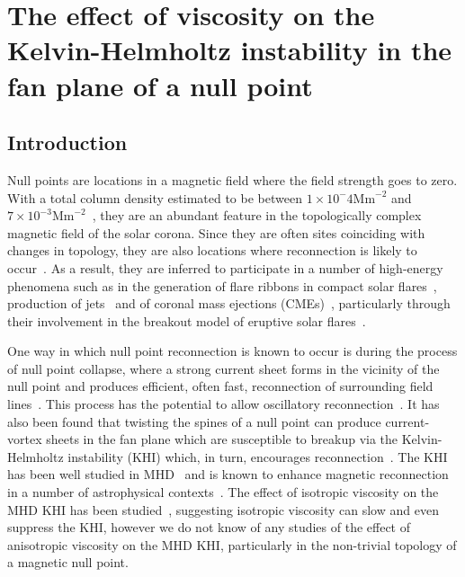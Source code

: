 \chapter{The effect of viscosity on the Kelvin-Helmholtz instability in the fan plane of a null point}

\graphicspath{{images/null_point_khi/}}

\section{Introduction}

Null points are locations in a magnetic field where the field strength goes to zero. With a total column density estimated to be between $1\times 10^-4 \text{Mm}^{-2}$ and $7\times 10^{-3} \text{Mm}^{-2}$~\cite{edwardsNullPointDistribution2015}, they are an abundant feature in the topologically complex magnetic field of the solar corona. Since they are often sites coinciding with changes in topology, they are also locations where reconnection is likely to occur~\cite{yangImagingSpectralStudy2020,sunHOTSPINELOOPS2013}. As a result, they are inferred to participate in a number of high-energy phenomena such as in the generation of flare ribbons in compact solar flares~\cite{massonNATUREFLARERIBBONS2009,pontinWhyAreFlare2016a}, production of jets~\cite{moreno-insertisPLASMAJETSERUPTIONS2013} and of coronal mass ejections (CMEs)~\cite{barnesRelationshipCoronalMagnetic2007,zouContinuousNullPointMagnetic2020}, particularly through their involvement in the breakout model of eruptive solar flares~\cite{macleanTopologicalAnalysisMagnetic2005}.

One way in which null point reconnection is known to occur is during the process of null point collapse, where a strong current sheet forms in the vicinity of the null point and produces efficient, often fast, reconnection of surrounding field lines~\cite{thurgoodImplosiveCollapseMagnetic2018}. This process has the potential to allow oscillatory reconnection~\cite{thurgoodThreedimensionalOscillatoryMagnetic2017}. It has also been found that twisting the spines of a null point can produce current-vortex sheets in the fan plane which are susceptible to breakup via the Kelvin-Helmholtz instability (KHI) which, in turn, encourages reconnection~\cite{wyperKelvinHelmholtzInstabilityCurrentvortex2013}. The KHI has been well studied in MHD~\cite{chandrasekharHydrodynamicHydromagneticStability1981,einaudiResistiveInstabilitiesFlowing1986} and is known to enhance magnetic reconnection in a number of astrophysical contexts~\cite{minEffectsMagneticReconnection1997,kowalKelvinHelmholtzTearingInstability2020}. The effect of isotropic viscosity on the MHD KHI has been studied~\cite{howsonEffectsResistivityViscosity2017,roedigerViscousKelvinHelmholtzInstabilities2013a,wyperKelvinHelmholtzInstabilityCurrentvortex2013}, suggesting isotropic viscosity can slow and even suppress the KHI, however we do not know of any studies of the effect of anisotropic viscosity on the MHD KHI, particularly in the non-trivial topology of a magnetic null point.

